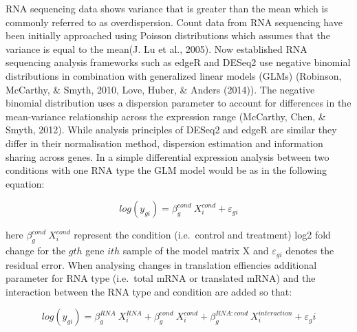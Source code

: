 \documentclass[12pt,openany]{book}
\begin{document}
RNA sequencing data shows variance that is greater than the mean which
is commonly referred to as overdispersion. Count data from RNA
sequencing have been initially approached using Poisson distributions
which assumes that the variance is equal to the mean(J. Lu et al.,
2005). Now established RNA sequencing analysis frameworks such as edgeR
and DESeq2 use negative binomial distributions in combination with
generalized linear models (GLMs) (Robinson, McCarthy, \& Smyth, 2010,
Love, Huber, \& Anders (2014)). The negative binomial distribution uses
a dispersion parameter to account for differences in the mean-variance
relationship across the expression range (McCarthy, Chen, \& Smyth,
2012). While analysis principles of DESeq2 and edgeR are similar they
differ in their normalisation method, dispersion estimation and
information sharing across genes. In a simple differential expression
analysis between two conditions with one RNA type the GLM model would be
as in the following equation:

\[log(y_{gi}) = \beta_g^{cond}\ X_i^{cond} + \varepsilon_{gi}\]

here \(\beta_g^{cond}\ X_i^{cond}\) represent the condition
(i.e.~control and treatment) log2 fold change for the \(gth\) gene
\(ith\) sample of the model matrix X and \(\varepsilon_{gi}\) denotes
the residual error. When analysing changes in translation effiencies
additional parameter for RNA type (i.e.~total mRNA or translated mRNA)
and the interaction between the RNA type and condition are added so
that:

\[log(y_{gi}) = \beta_g^{RNA}\ X_i^{RNA}+ \beta_g^{cond}\ X_i^{cond} + \beta_g^{RNA:cond}\ X_i^{interaction} + \varepsilon_gi\]
\end{document}
